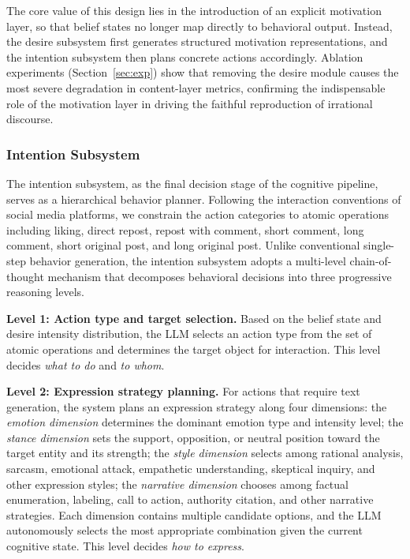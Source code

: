 \documentclass[a4paper,fleqn]{cas-dc}
\begin{document}
The core value of this design lies in the introduction of an explicit motivation layer, so that belief states no longer map directly to behavioral output. Instead, the desire subsystem first generates structured motivation representations, and the intention subsystem then plans concrete actions accordingly. Ablation experiments (Section~\ref{sec:exp}) show that removing the desire module causes the most severe degradation in content-layer metrics, confirming the indispensable role of the motivation layer in driving the faithful reproduction of irrational discourse.

\subsubsection{Intention Subsystem}

The intention subsystem, as the final decision stage of the cognitive pipeline, serves as a hierarchical behavior planner. Following the interaction conventions of social media platforms, we constrain the action categories to atomic operations including liking, direct repost, repost with comment, short comment, long comment, short original post, and long original post. Unlike conventional single-step behavior generation, the intention subsystem adopts a multi-level chain-of-thought mechanism that decomposes behavioral decisions into three progressive reasoning levels.

\textbf{Level 1: Action type and target selection.} Based on the belief state and desire intensity distribution, the LLM selects an action type from the set of atomic operations and determines the target object for interaction. This level decides \textit{what to do} and \textit{to whom}.

\textbf{Level 2: Expression strategy planning.} For actions that require text generation, the system plans an expression strategy along four dimensions: the \textit{emotion dimension} determines the dominant emotion type and intensity level; the \textit{stance dimension} sets the support, opposition, or neutral position toward the target entity and its strength; the \textit{style dimension} selects among rational analysis, sarcasm, emotional attack, empathetic understanding, skeptical inquiry, and other expression styles; the \textit{narrative dimension} chooses among factual enumeration, labeling, call to action, authority citation, and other narrative strategies. Each dimension contains multiple candidate options, and the LLM autonomously selects the most appropriate combination given the current cognitive state. This level decides \textit{how to express}.
\end{document}
